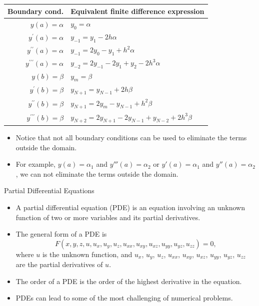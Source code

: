 \documentclass{beamer}
\begin{document}
\begin{frame}
    \begin{tabular}{|r|l|}
        \hline Boundary cond. & Equivalent finite difference expression \\
        \hline$y(a)=\alpha$ & $y_0=\alpha$ \\
        $y^{\prime}(a)=\alpha$ & $y_{-1}=y_1-2 h \alpha$ \\
        $y^{\prime \prime}(a)=\alpha$ & $y_{-1}=2 y_0-y_1+h^2 \alpha$ \\
        $y^{\prime \prime \prime}(a)=\alpha$ & $y_{-2}=2 y_{-1}-2 y_1+y_2-2 h^3 \alpha$ \\
        \hline$y(b)=\beta$ & $y_m=\beta$ \\
        $y^{\prime}(b)=\beta$ & $y_{N+1}=y_{N-1}+2 h \beta$ \\
        $y^{\prime \prime}(b)=\beta$ & $y_{N+1}=2 y_m-y_{N-1}+h^2 \beta$ \\
        $y^{\prime \prime \prime}(b)=\beta$ & $y_{N+2}=2 y_{N+1}-2 y_{N-1}+y_{N-2}+2 h^3 \beta$ \\
        \hline
        \end{tabular}

        \begin{itemize}
            \item Notice that not all boundary conditions can be used to eliminate the terms outside the domain.
            \item  For example, $y(a)=\alpha_1$ and $y'''(a)=\alpha_2$ or $y'(a)=\alpha_1$ and $y''(a)=\alpha_2$, 
            we can not eliminate the terms outside the domain. 
        \end{itemize}
        
\end{frame}
\begin{frame}{Partial Differential Equations}
\begin{itemize}
    \item A partial differential equation (PDE) is an equation involving an unknown function of two or more variables and its partial derivatives.
    \item The general form of a PDE is
     \[
     F(x, y, z, u, u_x, u_y, u_z, u_{xx}, u_{xy}, u_{xz}, u_{yy}, u_{yz}, u_{zz}) = 0,
     \]
     where $u$ is the unknown function, and $u_x$, $u_y$, $u_z$, $u_{xx}$, $u_{xy}$, $u_{xz}$, $u_{yy}$, $u_{yz}$, $u_{zz}$ are the partial derivatives of $u$.
\item The order of a PDE is the order of the highest derivative in the equation.
\item PDEs can
lead to some of the most challenging of numerical problems. 

\end{itemize}
\end{frame}
\end{document}
